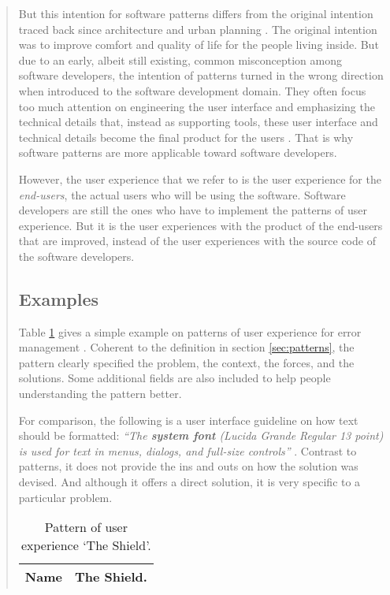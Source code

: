 \documentclass[a4paper,titlepage]{article}
\begin{document}
\begin{quote}
But this intention for software patterns differs from the original
intention traced back since architecture and urban planning
\citep{timeless:alexander}. The original intention was to improve
comfort and quality of life for the people living inside. But due to
an early, albeit still existing, common misconception among software
developers, the intention of patterns turned in the wrong direction
when introduced to the software development domain. They often focus
too much attention on engineering the user interface and emphasizing
the technical details that, instead as supporting tools, these user
interface and technical details become the final product for the users
\citep{pux:blackwell}. That is why software patterns are more
applicable toward software developers.

However, the user experience that we refer to is the user experience
for the \textit{end-users}, the actual users who will be using the
software. Software developers are still the ones who have to implement
the patterns of user experience. But it is the user experiences with
the product of the end-users that are improved, instead of the user
experiences with the source code of the software developers.

\subsection{Examples}
Table \ref{tab:shield} gives a simple example on patterns of user
experience for error management \citep{patterns:welie}. Coherent to
the definition in section \ref{sec:patterns}, the pattern clearly
specified the problem, the context, the forces, and the
solutions. Some additional fields are also included to help people
understanding the pattern better.

For comparison, the following is a user interface guideline on how
text should be formatted: \textit{``The \textbf{system font} (Lucida
  Grande Regular 13 point) is used for text in menus, dialogs, and
  full-size controls''} \citep{hig:apple}. Contrast to patterns, it
does not provide the ins and outs on how the solution was devised. And
although it offers a direct solution, it is very specific to a
particular problem.

\begin{table}[!t]
  \caption{Pattern of user experience `The Shield'.}
  \label{tab:shield}
  \begin{center}
    \begin{tabular}{| p{} || p{} |}
      \hline
      Name & The Shield. \\ \hline


\end{tabular}
\end{center}
\end{table}
\end{quote}
\end{document}

